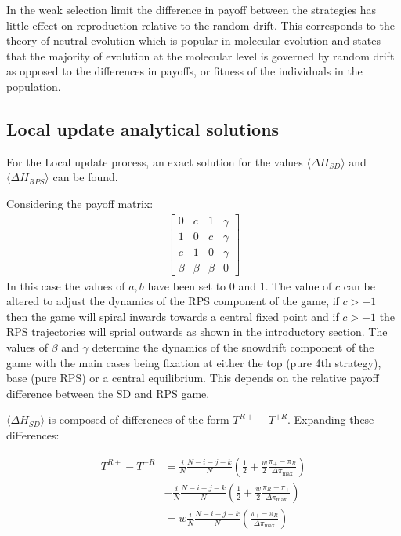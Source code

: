 \documentclass[%
 reprint,
 amsmath,amssymb,
 aps,
]{revtex4-2}
\begin{document}
In the weak selection limit the difference in payoff between the strategies has little effect on 
reproduction relative to the random drift. This corresponds to the theory of neutral evolution which is popular in 
molecular evolution and states that the majority of evolution at the molecular level is governed by random drift as opposed
to the differences in payoffs, or fitness of the individuals in the population.

\subsection{\label{section:local_analytical}Local update analytical solutions}


For the Local update process, an exact solution for the values 
$\langle \Delta H_{SD} \rangle$ and $\langle \Delta H_{RPS} \rangle$
can be found.

Considering the payoff matrix:
\begin{align} \label{SimplifiedRPS}
\begin{bmatrix}
    0 & c & 1 & \gamma\\
    1 & 0 & c & \gamma\\
    c & 1 & 0 & \gamma\\
    \beta & \beta & \beta & 0
\end{bmatrix}
\end{align}
In this case the values of $a,b$ have been set to 0 and 1. The value of $c$ can be
altered to adjust the dynamics of the RPS component of the game, if $c > -1$
then the game will spiral inwards towards a central fixed point and if $c > - 1$
the RPS trajectories will sprial outwards as shown in the introductory section.
The values of $\beta$ and $\gamma$ determine the dynamics of the snowdrift component of the 
game with the main cases being fixation at either the top (pure 4th strategy), base (pure RPS) or a central equilibrium.
This depends on the relative payoff difference between the SD and RPS game.


$\langle \Delta H_{SD} \rangle$ is composed of differences of the form 
$T^{R+} - T^{+R}$. Expanding these differences:


\begin{align}
T^{R+} - T^{+R} &= \frac{i}{N}\frac{N-i-j-k}{N}\left(\frac{1}{2} + \frac{w}{2}\frac{\pi_+ - \pi_R}{\Delta \pi_{\text{max}}}\right) \nonumber \\
&- \frac{i}{N}\frac{N-i-j-k}{N}\left(\frac{1}{2} + \frac{w}{2}\frac{\pi_R - \pi_+}{\Delta \pi_{\text{max}}}\right) \nonumber \\
&= w\frac{i}{N}\frac{N-i-j-k}{N}\left(\frac{\pi_+ - \pi_R}{\Delta \pi_{\text{max}}}\right)\nonumber
\end{align}
\end{document}
